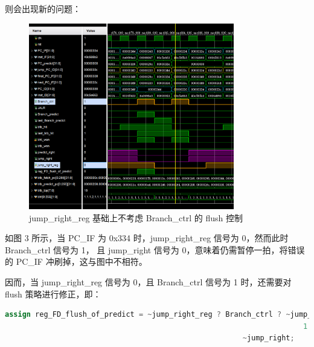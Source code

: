 \documentclass{article}
\begin{document}
\begin{enumerate}
\begin{enumerate}
        \newpage
        则会出现新的问题：\par
        \begin{figure}[h]
            \centering
            \includegraphics[width=0.8\textwidth]{image/flush_Branch_ctrl.png}
            \caption{jump\_right\_reg 基础上不考虑 Branch\_ctrl 的 flush 控制}
        \end{figure}

        如图 3 所示，当 PC\_IF 为 0x334 时，jump\_right\_reg 信号为 0，然而此时 Branch\_ctrl 信号为 1，
        且 jump\_right 信号为 0，意味着仍需暂停一拍，将错误的 PC\_IF 冲刷掉，这与图中不相符。\par
        因而，当 jump\_right\_reg 信号为 0，且 Branch\_ctrl 信号为 1 时，还需要对 flush 策略进行修正，即：\par
        \begin{lstlisting}[language=verilog]
    assign reg_FD_flush_of_predict = ~jump_right_reg ? Branch_ctrl ? ~jump_right :
                                                                     1'b0;
                                                       ~jump_right;
        \end{lstlisting}


\end{enumerate}
\end{enumerate}
\end{document}
